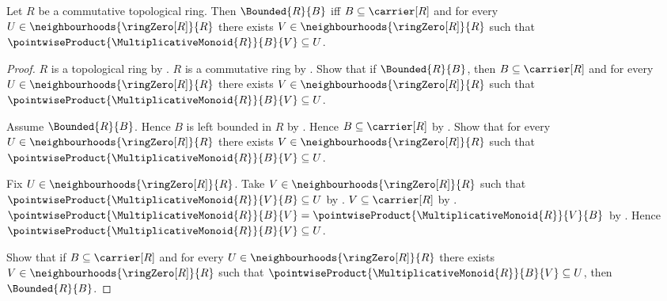 \begin{theorem}\label{bounded_iff_right_neighbourhood}
    Let $R$ be a commutative topological ring.
    Then $\Bounded{R}{B}$ iff
        $B\subseteq\carrier[R]$ and
        for every $U\in\neighbourhoods{\ringZero[R]}{R}$ there exists
            $V\in\neighbourhoods{\ringZero[R]}{R}$ such that
            $\pointwiseProduct{\MultiplicativeMonoid{R}}{B}{V}\subseteq U$.
\end{theorem}
\begin{proof}
    $R$ is a topological ring by
        .
    $R$ is a commutative ring by
        .
    Show that if $\Bounded{R}{B}$, then
        $B\subseteq\carrier[R]$ and
        for every $U\in\neighbourhoods{\ringZero[R]}{R}$ there exists
            $V\in\neighbourhoods{\ringZero[R]}{R}$ such that
            $\pointwiseProduct{\MultiplicativeMonoid{R}}{B}{V}\subseteq U$.
    \begin{subproof}
        Assume $\Bounded{R}{B}$.
        Hence $B$ is left bounded in $R$ by .
        Hence $B\subseteq\carrier[R]$ by .
        Show that for every $U\in\neighbourhoods{\ringZero[R]}{R}$ there
            exists $V\in\neighbourhoods{\ringZero[R]}{R}$ such that
            $\pointwiseProduct{\MultiplicativeMonoid{R}}{B}{V}\subseteq U$.
        \begin{subproof}
            Fix $U\in\neighbourhoods{\ringZero[R]}{R}$.
            Take $V\in\neighbourhoods{\ringZero[R]}{R}$ such that
                $\pointwiseProduct{\MultiplicativeMonoid{R}}{V}{B}
                    \subseteq U$ by .
            $V\subseteq\carrier[R]$ by
                .
            $\pointwiseProduct{\MultiplicativeMonoid{R}}{B}{V}
                =\pointwiseProduct{\MultiplicativeMonoid{R}}{V}{B}$ by
                .
            Hence $\pointwiseProduct{\MultiplicativeMonoid{R}}{B}{V}
                \subseteq U$.
        \end{subproof}
    \end{subproof}
    Show that if $B\subseteq\carrier[R]$ and
        for every $U\in\neighbourhoods{\ringZero[R]}{R}$ there exists
            $V\in\neighbourhoods{\ringZero[R]}{R}$ such that
            $\pointwiseProduct{\MultiplicativeMonoid{R}}{B}{V}\subseteq U$,
        then $\Bounded{R}{B}$.

\end{proof}
